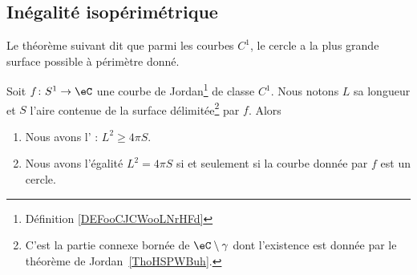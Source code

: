 \subsection{Inégalité isopérimétrique}

Le théorème suivant dit que parmi les courbes \( C^1\), le cercle a la plus grande surface possible à périmètre donné.
\begin{theorem}    \label{ThoIXyctPo}
	Soit \( f\colon S^1\to \eC \) une courbe de Jordan\footnote{Définition \ref{DEFooCJCWooLNrHFd}} de classe \( C^1\). Nous notons \( L\) sa longueur et \( S\) l'aire contenue de la surface délimitée\footnote{C'est la partie connexe bornée de \( \eC\setminus\gamma\) dont l'existence est donnée par le théorème de Jordan~\ref{ThoHSPWBuh}.} par \( f\). Alors
	\begin{enumerate}
		\item
		      Nous avons l' : \( L^2\geq 4\pi S\).
		\item
		      Nous avons l'égalité \( L^2=4\pi S\) si et seulement si la courbe donnée par \( f\) est un cercle.
	\end{enumerate}
\end{theorem}

